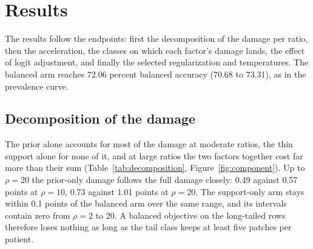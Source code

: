 \section{Results}
\label{sec:results}
The results follow the endpoints: first the decomposition of the damage per ratio, then the acceleration, the classes on which each factor's damage lands, the effect of logit adjustment, and finally the selected regularization and temperatures. The balanced arm reaches 72.06 percent balanced accuracy (70.68 to 73.31), as in the prevalence curve.

\subsection{Decomposition of the damage}
\label{sec:decomposition-results}
The prior alone accounts for most of the damage at moderate ratios, the thin support alone for none of it, and at large ratios the two factors together cost far more than their sum (Table~\ref{tab:decomposition}, Figure~\ref{fig:component}). Up to $\rho=20$ the prior-only damage follows the full damage closely: 0.49 against 0.57 points at $\rho=10$, 0.73 against 1.01 points at $\rho=20$. The support-only arm stays within 0.1 points of the balanced arm over the same range, and its intervals contain zero from $\rho=2$ to 20. A balanced objective on the long-tailed rows therefore loses nothing as long as the tail class keeps at least five patches per patient.

